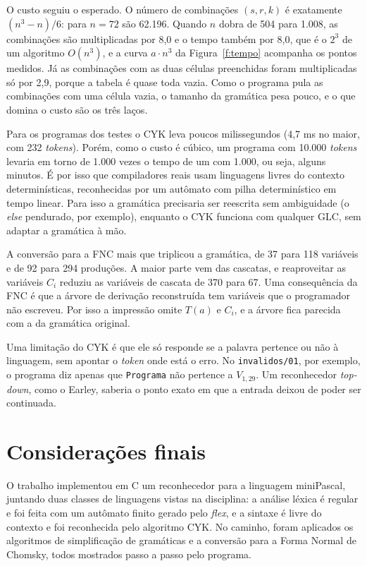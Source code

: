 \documentclass[12pt,a4paper]{article}
\newcommand{\code}[1]{\texttt{#1}}
\newcommand{\miniPascal}{miniPascal}
\begin{document}
O custo seguiu o esperado. O número de combinações $(s, r, k)$ é exatamente $(n^3 - n)/6$:
para $n = 72$ são 62.196. Quando $n$ dobra de 504 para 1.008, as combinações são multiplicadas
por 8,0 e o tempo também por 8,0, que é o $2^3$ de um algoritmo $O(n^3)$, e a curva $a \cdot n^3$
da Figura~\ref{f:tempo} acompanha os pontos medidos. Já as combinações com as duas células
preenchidas foram multiplicadas só por 2,9, porque a tabela é quase toda vazia. Como o programa
pula as combinações com uma célula vazia, o tamanho da gramática pesa pouco, e o que domina o
custo são os três laços.

Para os programas dos testes o CYK leva poucos milissegundos (4,7 ms no maior, com 232
\textit{tokens}). Porém, como o custo é cúbico, um programa com 10.000 \textit{tokens} levaria
em torno de 1.000 vezes o tempo de um com 1.000, ou seja, alguns minutos. É por isso que
compiladores reais usam linguagens livres do contexto determinísticas, reconhecidas por um
autômato com pilha determinístico em tempo linear. Para isso a gramática precisaria ser
reescrita sem ambiguidade (o \textit{else} pendurado, por exemplo), enquanto o CYK funciona com
qualquer GLC, sem adaptar a gramática à mão.

A conversão para a FNC mais que triplicou a gramática, de 37 para 118 variáveis e de 92 para 294
produções. A maior parte vem das cascatas, e reaproveitar as variáveis $C_i$ reduziu as
variáveis de cascata de 370 para 67. Uma consequência da FNC é que a árvore de derivação
reconstruída tem variáveis que o programador não escreveu. Por isso a impressão omite $T(a)$ e
$C_i$, e a árvore fica parecida com a da gramática original.

Uma limitação do CYK é que ele só responde se a palavra pertence ou não à linguagem, sem
apontar o \textit{token} onde está o erro. No \code{invalidos/01}, por exemplo, o programa diz
apenas que \code{Programa} não pertence a $V_{1,29}$. Um reconhecedor \textit{top-down}, como o
Earley, saberia o ponto exato em que a entrada deixou de poder ser continuada.

\section{Considerações finais}

O trabalho implementou em C um reconhecedor para a linguagem \miniPascal{}, juntando duas classes
de linguagens vistas na disciplina: a análise léxica é regular e foi feita com um autômato finito
gerado pelo \textit{flex}, e a sintaxe é livre do contexto e foi reconhecida pelo algoritmo CYK.
No caminho, foram aplicados os algoritmos de simplificação de gramáticas e a conversão para a
Forma Normal de Chomsky, todos mostrados passo a passo pelo programa.
\end{document}
